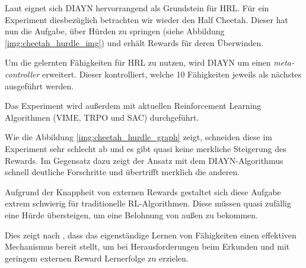 Laut \cite{diversity_eysenbach} eignet sich DIAYN hervorrangend als Grundstein für HRL. Für ein Experiment diesbezüglich betrachten wir wieder den Half Cheetah. Dieser hat nun die Aufgabe, über Hürden zu springen (siehe Abbildung \ref{img:cheetah_hurdle_img}) und erhält Rewards für deren Überwinden.

Um die gelernten Fähigkeiten für HRL zu nutzen, wird DIAYN um einen \textit{meta-controller} erweitert. Dieser kontrolliert, welche 10 Fähigkeiten jeweils als nächstes ausgeführt werden.

Das Experiment wird außerdem mit aktuellen Reinforcement Learning Algorithmen (VIME, TRPO und SAC) durchgeführt.

Wie die Abbildung \ref{img:cheetah_hurdle_graph} zeigt, schneiden diese im Experiment sehr schlecht ab und es gibt quasi keine merkliche Steigerung des Rewards. Im Gegensatz dazu zeigt der Ansatz mit dem DIAYN-Algorithmus schnell deutliche Forschritte und übertrifft merklich die anderen.

Aufgrund der Knappheit von externen Rewards gestaltet sich diese Aufgabe extrem schwierig für traditionelle RL-Algorithmen. Diese müssen quasi zufällig eine Hürde übersteigen, um eine Belohnung von außen zu bekommen.

Dies zeigt nach \cite{diversity_eysenbach}, dass das eigenständige Lernen von Fähigkeiten einen effektiven Mechanismus bereit stellt, um bei Herausforderungen beim Erkunden und mit geringem externen Reward Lernerfolge zu erzielen.
